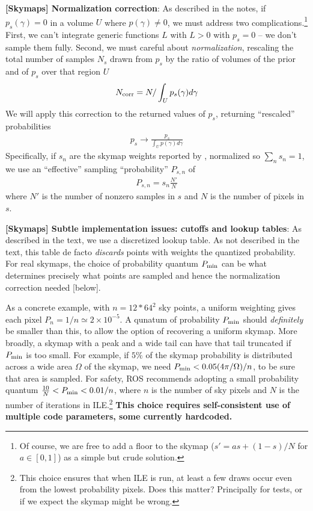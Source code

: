 \noindent \textbf{[Skymaps] Normalization correction}: As described in the notes, if $p_s(\gamma)=0$  in a volume $U$ where $p(\gamma)\ne 0$, we must address two
complications.\footnote{Of course, we are free to add a floor to the skymap ($s'=a s + (1-s)/N$ for $a\in[0,1]$) as a simple but crude solution.}  First, we can't integrate generic functions $L$ with $L>0$ with $p_s=0$ -- we don't sample them fully.  
Second, we must careful about \emph{normalization}, rescaling the total number of samples $N_s$ drawn from $p_s$ by the
ratio of volumes of the prior and of $p_s$ over that region $U$
\begin{eqnarray}
N_{\rm corr} = N / \int_U p_s(\gamma) d\gamma
\end{eqnarray}
We will apply this correction to the returned values of $p_s$, returning ``rescaled'' probabilities 
\begin{eqnarray}
p_s \rightarrow \frac{p_s}{\int_U p(\gamma)  d\gamma}
\end{eqnarray}
Specifically,  if $s_n$ are the  skymap weights reported by \BS, normalized so $\sum_n s_n=1$, we use an ``effective''
sampling ``probability'' $P_{s,n}$ of
\begin{eqnarray}
P_{s,n} = s_n \frac{N'}{N}
\end{eqnarray}
where $N'$ is the number of nonzero samples in $s$ and $N$ is the number of pixels in $s$.

\noindent \textbf{[Skymaps] Subtle implementation issues: cutoffs and lookup tables}: As described in the text, we use a
discretized lookup table.  As not described in the text, this table de facto \emph{discards} points with weights the
quantized probability.   For real skymaps, the choice of probability quantum $P_{\rm min}$ can be what determines
precisely what points are sampled and hence the normalization correction needed [below].

As a concrete example, with $n=12*64^2$ sky points, a uniform weighting gives each pixel $P_{n}
=1/n \simeq 2\times 10^{-5}$.  A qunatum of probability $P_{\rm min} $ should \emph{definitely} be smaller than this, to
allow the option of recovering a uniform skymap.
%
More broadly, a skymap with a peak and a wide tail can have that tail truncated if $P_{\rm min}$ is too small.  For
example, if $5\%$ of the skymap probability is distributed across a wide area $\Omega$ of the skymap, we need $P_{\rm
  min} < 0.05 (4\pi/\Omega)/n$, to be sure that area is sampled.  
%
For safety, ROS recommends adopting a small probability quantum $\frac{10}{N}<P_{\rm min} < 0.01/n$, where $n$ is the
number of sky pixels and $N$ is the number of iterations in ILE.\footnote{This choice ensures that when ILE is run, at
  least a few draws occur even from the lowest probability pixels.  Does this matter?  Principally for tests, or if
we expect the \BS{} skymap might be wrong.}  \textbf{This choice requires self-consistent use of
  multiple code parameters, some currently hardcoded. }

